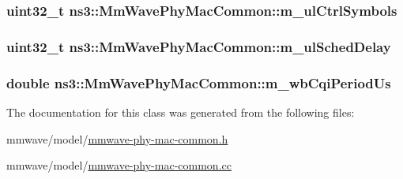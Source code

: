 \subsubsection[{\texorpdfstring{m\+\_\+ul\+Ctrl\+Symbols}{m_ulCtrlSymbols}}]{\setlength{\rightskip}{0pt plus 5cm}uint32\+\_\+t ns3\+::\+Mm\+Wave\+Phy\+Mac\+Common\+::m\+\_\+ul\+Ctrl\+Symbols\hspace{0.3cm}{\ttfamily [private]}}\hypertarget{classns3_1_1MmWavePhyMacCommon_a221169a7e39b13f86c4795060350d406}{}\label{classns3_1_1MmWavePhyMacCommon_a221169a7e39b13f86c4795060350d406}
\subsubsection[{\texorpdfstring{m\+\_\+ul\+Sched\+Delay}{m_ulSchedDelay}}]{\setlength{\rightskip}{0pt plus 5cm}uint32\+\_\+t ns3\+::\+Mm\+Wave\+Phy\+Mac\+Common\+::m\+\_\+ul\+Sched\+Delay\hspace{0.3cm}{\ttfamily [private]}}\hypertarget{classns3_1_1MmWavePhyMacCommon_ae81ae7fdf0624e2384178c40c5362f39}{}\label{classns3_1_1MmWavePhyMacCommon_ae81ae7fdf0624e2384178c40c5362f39}
\subsubsection[{\texorpdfstring{m\+\_\+wb\+Cqi\+Period\+Us}{m_wbCqiPeriodUs}}]{\setlength{\rightskip}{0pt plus 5cm}double ns3\+::\+Mm\+Wave\+Phy\+Mac\+Common\+::m\+\_\+wb\+Cqi\+Period\+Us\hspace{0.3cm}{\ttfamily [private]}}\hypertarget{classns3_1_1MmWavePhyMacCommon_a51c7d963b55442020bb4d54074fca3eb}{}\label{classns3_1_1MmWavePhyMacCommon_a51c7d963b55442020bb4d54074fca3eb}


The documentation for this class was generated from the following files\+:\begin{DoxyCompactItemize}
\item 
mmwave/model/\hyperlink{mmwave-phy-mac-common_8h}{mmwave-\/phy-\/mac-\/common.\+h}\item 
mmwave/model/\hyperlink{mmwave-phy-mac-common_8cc}{mmwave-\/phy-\/mac-\/common.\+cc}\end{DoxyCompactItemize}
